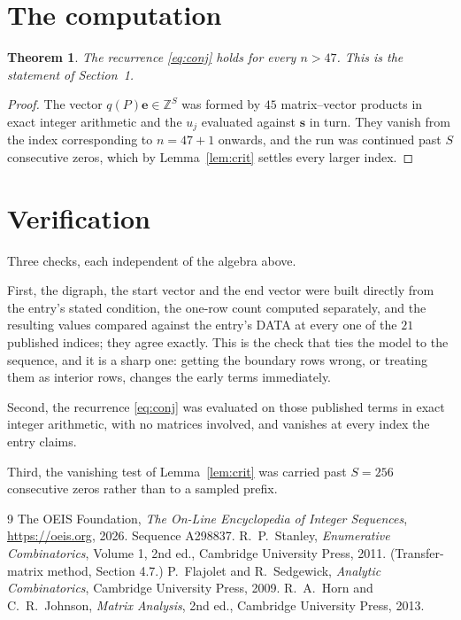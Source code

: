 \documentclass[11pt,a4paper]{article}
\theoremstyle{plain}
\newtheorem{theorem}{Theorem}
\theoremstyle{definition}
\begin{document}
\section{The computation}

\begin{theorem}
The recurrence \eqref{eq:conj} holds for every $n>47$. This is the statement of
Section~1.
\end{theorem}

\begin{proof}
The vector $q(P)\mathbf{e}\in\mathbb{Z}^{S}$ was formed by $45$ matrix--vector
products in exact integer arithmetic and the $u_j$ evaluated against $\mathbf{s}$ in turn.
They vanish from the index corresponding to $n=47+1$ onwards, and the run was continued
past $S$ consecutive zeros, which by Lemma~\ref{lem:crit} settles every larger index.
\end{proof}

\section{Verification}

Three checks, each independent of the algebra above.

First, the digraph, the start vector and the end vector were built directly from the
entry's stated condition, the one-row count computed separately, and the resulting values
compared against the entry's DATA at every one of the $21$ published indices; they
agree exactly. This is the check that ties the model to the sequence, and it is a sharp one:
getting the boundary rows wrong, or treating them as interior rows, changes the early terms
immediately.

Second, the recurrence \eqref{eq:conj} was evaluated on those published terms in exact
integer arithmetic, with no matrices involved, and vanishes at every index the entry claims.

Third, the vanishing test of Lemma~\ref{lem:crit} was carried past $S=256$ consecutive
zeros rather than to a sampled prefix.

\begin{thebibliography}{9}
 The OEIS Foundation, \emph{The On-Line Encyclopedia of Integer
Sequences}, \url{https://oeis.org}, 2026. Sequence A298837.
 R.~P.~Stanley, \emph{Enumerative Combinatorics}, Volume 1, 2nd ed.,
Cambridge University Press, 2011. (Transfer-matrix method, Section 4.7.)
 P.~Flajolet and R.~Sedgewick, \emph{Analytic Combinatorics}, Cambridge
University Press, 2009.
 R.~A.~Horn and C.~R.~Johnson, \emph{Matrix Analysis}, 2nd ed., Cambridge
University Press, 2013.
\end{thebibliography}
\end{document}
